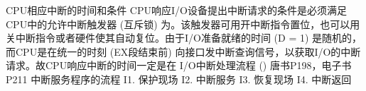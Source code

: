 \markdownRendererOlBeginTight
{}CPU相应中断的时间和条件 CPU响应I/O设备提出中断请求的条件是必须满足CPU中的允许中断触发器 (互斥锁) 为。该触发器可用开中断指令置位，也可以用关中断指令或者硬件使其自动复位。由于I/O准备就绪的时间 (D = 1) 是随机的，而CPU是在统一的时刻 (EX段结束前) 向接口发中断查询信号，以获取I/O的中断请求。故CPU响应中断的时间一定是在\markdownRendererOlItemEnd 
{}I/O中断处理流程 () 唐书P198，电子书P211\markdownRendererOlItemEnd 
{}中断服务程序的流程 \markdownRendererCircumflex{}\markdownRendererCircumflex{}I1. 保护现场 \markdownRendererCircumflex{}\markdownRendererCircumflex{}I2. 中断服务 \markdownRendererCircumflex{}\markdownRendererCircumflex{}I3. 恢复现场 \markdownRendererCircumflex{}\markdownRendererCircumflex{}I4. 中断返回\markdownRendererOlItemEnd 
\markdownRendererOlEndTight \relax